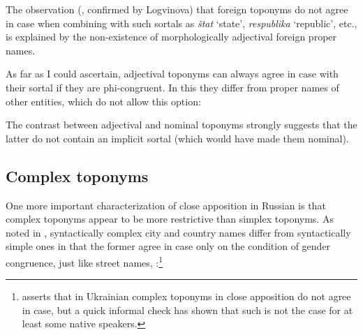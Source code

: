 \documentclass[output=paper,colorlinks,citecolor=brown]{langscibook}
\begin{document}
\noindent The observation (\citealt[143]{GraudinaKatlinskaja1976}, confirmed by Logvinova) that foreign toponyms do not agree in case when combining with such sortals as \textit{štat} ‘state’, \textit{respublika} ‘republic’, etc., is explained by the non-existence of morphologically adjectival foreign proper names.

As far as I could ascertain, adjectival toponyms can always agree in case with their sortal if they are phi-congruent. In this they differ from proper names of other entities, which do not allow this option:

\ea\label{mat:ex:minonosec-roman}
\z
\z

\noindent The contrast between adjectival and nominal toponyms strongly suggests that the latter do not contain an implicit sortal (which would have made them nominal).

\subsection{Complex toponyms}\label{mat:sec:complex-toponyms}

One more important characterization of close apposition in Russian is that complex toponyms appear to be more restrictive than simplex toponyms. As noted in \citet[142]{GraudinaKatlinskaja1976}, syntactically complex city and country names differ from syntactically simple ones in that the former agree in case only on the condition of gender congruence, just like street names, :\footnote{\citet{Gorpinic1987} asserts that in Ukrainian complex toponyms in close apposition do not agree in case, but a quick informal check has shown that such is not the case for at least some native speakers.}
\end{document}
